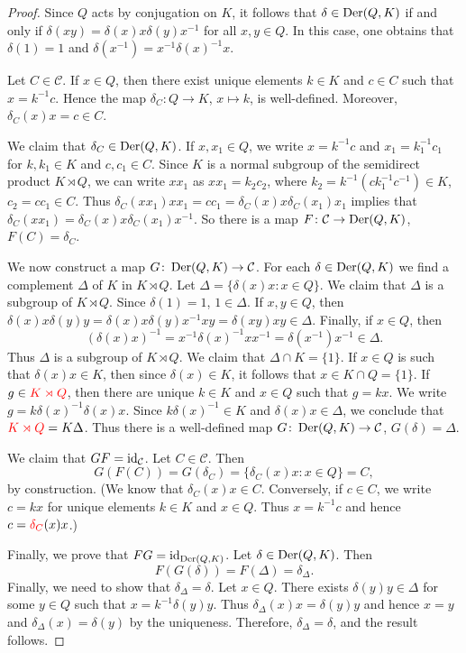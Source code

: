 \begin{proof}
	Since $Q$ acts by conjugation on $K$, it follows that $\delta\in\operatorname{Der}(Q,K)$ if and only if 
	$\delta(xy)=\delta(x)x\delta(y)x^{-1}$ for all $x,y\in Q$. In this case, 
	one obtains that 
	$\delta(1)=1$ and $\delta(x^{-1})=x^{-1}\delta(x)^{-1}x$.
	
	Let 
	$C\in\mathcal{C}$. If $x\in Q$, then there exist unique elements  
	$k\in K$ and $c\in C$ such that $x=k^{-1}c$. Hence the  map 
	$\delta_C\colon Q\to K$, $x\mapsto k$, is well-defined. Moreover, 
	$\delta_C(x)x=c\in C$. 
	
	We claim that $\delta_C\in\operatorname{Der}(Q,K)$. If $x,x_1\in Q$, we write $x=k^{-1}c$
	and $x_1=k_1^{-1}c_1$ for $k,k_1\in K$ and $c,c_1\in C$. Since $K$ is a normal subgroup of 
	the semidirect product $K\rtimes Q$, we can write $xx_1$ as $xx_1=k_2c_2$, where 
	$k_2=k^{-1}(ck_1^{-1}c^{-1})\in K$, $c_2=cc_1\in C$. Thus  
	$\delta_C(xx_1)xx_1=cc_1=\delta_C(x)x\delta_C(x_1)x_1$ 
	implies that $\delta_C(xx_1)=\delta_C(x)x\delta_C(x_1)x^{-1}$. 
	So there is a map $F\colon\mathcal{C}\to\operatorname{Der}(Q,K)$, $F(C)=\delta_C$.

	We now construct a map $G\colon\operatorname{Der}(Q,K)\to\mathcal{C}$. 
	For each 
	$\delta\in\operatorname{Der}(Q,K)$ we find a complement $\Delta$ of $K$ in $K\rtimes Q$. Let 
	$\Delta=\{\delta(x)x:x\in Q\}$. 
	We claim that $\Delta$ is a subgroup of $K\rtimes Q$. Since $\delta(1)=1$,
	$1\in \Delta$. If $x,y\in Q$, then 
	$\delta(x)x\delta(y)y=\delta(x)x\delta(y)x^{-1}xy=\delta(xy)xy\in \Delta$.
	Finally, if $x\in Q$, then 
	\[
	(\delta(x)x)^{-1}=x^{-1}\delta(x)^{-1}xx^{-1}=\delta(x^{-1})x^{-1}\in \Delta.
	\]
	Thus $\Delta$ is a subgroup of $K\rtimes Q$.
	We claim that $\Delta\cap K=\{1\}$. If $x\in Q$ is such that $\delta(x)x\in K$, then 
    since $\delta(x)\in K$, it follows that $x\in K\cap Q=\{1\}$. If $g\in \textcolor{red}{K\rtimes Q}$, then 
	there are unique $k\in K$ and $x\in Q$ such that $g=kx$. We write 
	$g=k\delta(x)^{-1}\delta(x)x$. Since $k\delta(x)^{-1}\in K$ and $\delta(x)x\in
	\Delta$, we conclude that $\textcolor{red}{K\rtimes Q}=K\Delta$. Thus there is a well-defined map 
	$G\colon\operatorname{Der}(Q,K)\to\mathcal{C}$, $G(\delta)=\Delta$.

	We claim that $G F=\operatorname{id}_{\mathcal{C}}$. 
	Let $C\in\mathcal{C}$. Then  
	\[
	G(F(C))=G(\delta_C)=\{\delta_C(x)x:x\in
	Q\}=C,
	\]
	by construction. (We know that $\delta_C(x)x\in C$. Conversely, if $c\in
	C$, we write $c=kx$ for unique elements $k\in K$ and $x\in Q$. Thus $x=k^{-1}c$
	and hence $c=\textcolor{red}{\delta_C}(x)x$.)

	Finally, we prove that $F G=\operatorname{id}_{\operatorname{Der}(Q,K)}$. Let $\delta\in\operatorname{Der}(Q,K)$.
    Then	
    \[
	F(G(\delta))=F(\Delta)=\delta_{\Delta}.
	\]
	Finally, we need to show that $\delta_\Delta=\delta$.  Let $x\in Q$. There exists 
	$\delta(y)y\in\Delta$ for some $y\in Q$ such that $x=k^{-1}\delta(y)y$.
	Thus $\delta_{\Delta}(x)x=\delta(y)y$ and hence $x=y$ and $\delta_{\Delta}(x)=\delta(y)$ by
	the uniqueness. Therefore, $\delta_{\Delta}=\delta$, and the result follows. 
\end{proof}

